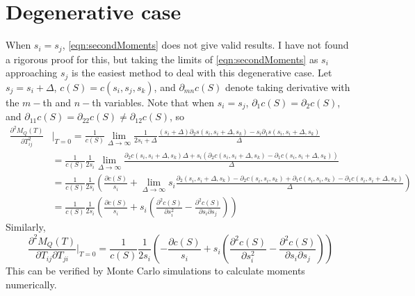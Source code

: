 \documentclass[10pt]{article}
\begin{document}
\section{Degenerative case}
When $s_i=s_j$, \eqref{eqn:secondMoments} does not give valid results.
I have not found a rigorous proof for this, but taking the limits of \eqref{eqn:secondMoments} as $s_i$ approaching $s_j$ is the easiest method to deal with this degenerative case.
Let $s_j=s_i+\Delta$, $c(S) = c(s_i,s_j,s_k)$, and $\partial_{mn}c(S)$ denote taking derivative with the $m-$th and $n-$th variables.
Note that when $s_i=s_j$, $\partial_1c(S) = \partial_2c(S)$, and $\partial_{11}c(S) = \partial_{22}c(S) \neq \partial_{12}c(S)$, so
\begin{align}
	\frac{\partial^2 M_Q(T)}{\partial T_{ij}^2}&\bigg|_{T=0} = \frac{1}{c(S)} \lim\limits_{\Delta\to\infty} \frac{1}{2s_i+\Delta} \frac{ (s_i+\Delta)\partial_2s(s_i,s_i+\Delta,s_k) - s_i\partial_1s(s_i,s_i+\Delta,s_k)}{\Delta} \nonumber \\
	&= \frac{1}{c(S)}\frac{1}{2s_i} \lim\limits_{\Delta\to\infty} \frac{\partial_2c(s_i,s_i+\Delta,s_k)\Delta + s_i \left(  \partial_2c(s_i,s_i+\Delta,s_k) - \partial_1c(s_i,s_i+\Delta,s_k) \right)}{\Delta} \nonumber \\
	&= \frac{1}{c(S)}\frac{1}{2s_i} \left( \frac{\partial c(S)}{s_i} + \lim\limits_{\Delta\to\infty} s_i\frac{\partial_2(s_i,s_i+\Delta,s_k) - \partial_2c(s_i,s_i,s_k) + \partial_1c(s_i,s_i,s_k) - \partial_1c(s_i,s_i+\Delta,s_k)}{\Delta} \right) \nonumber \\
	&= \frac{1}{c(S)}\frac{1}{2s_i} \left( \frac{\partial c(S)}{s_i} + s_i\left( \frac{\partial^2 c(S)}{\partial s_i^2} - \frac{\partial^2 c(S)}{\partial s_i \partial s_j} \right) \right)
\end{align}
Similarly,
\begin{equation}
	\frac{\partial^2 M_Q(T)}{\partial T_{ij}\partial T_{ji}}\bigg|_{T=0} = \frac{1}{c(S)}\frac{1}{2s_i}\left( -\frac{\partial c(S)}{s_i} + s_i\left( \frac{\partial^2 c(S)}{\partial s_i^2} - \frac{\partial^2 c(S)}{\partial s_i \partial s_j} \right) \right)
\end{equation}
This can be verified by Monte Carlo simulations to calculate moments numerically.



\end{document}
